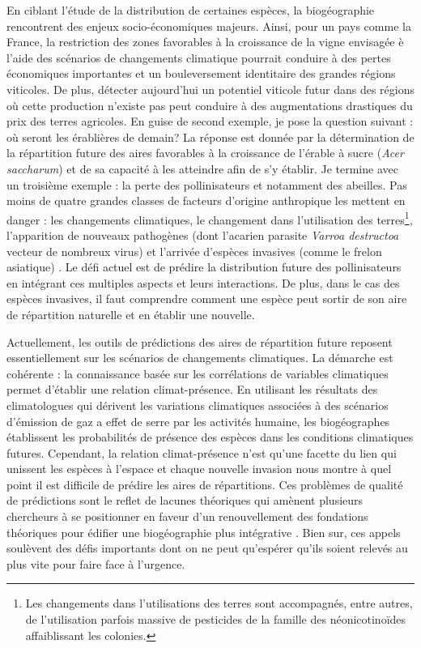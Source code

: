 En ciblant l'étude de la distribution de certaines espèces, la
biogéographie rencontrent des enjeux socio-économiques majeurs. Ainsi,
pour un pays comme la France, la restriction des zones favorables à la
croissance de la vigne envisagée è l'aide des scénarios de changements
climatique \citep{Hannah2013} pourrait conduire à des pertes économiques
importantes et un bouleversement identitaire des grandes régions
viticoles. De plus, détecter aujourd'hui un potentiel viticole futur
dans des régions où cette production n'existe pas peut conduire à des
augmentations drastiques du prix des terres agricoles. En guise de
second exemple, je pose la question suivant : où seront les érablières
de demain? La réponse est donnée par la détermination de la répartition
future des aires favorables à la croissance de l'érable à sucre
(\emph{Acer saccharum}) et de sa capacité à les atteindre afin de s'y
établir. Je termine avec un troisième exemple : la perte des
pollinisateurs et notamment des abeilles. Pas moins de quatre grandes
classes de facteurs d'origine anthropique les mettent en danger : les
changements climatiques, le changement dans l'utilisation des
terres\footnote{Les changements dans l'utilisations des terres sont
  accompagnés, entre autres, de l'utilisation parfois massive de
  pesticides de la famille des néonicotinoïdes affaiblissant les
  colonies.}, l'apparition de nouveaux pathogènes (dont l'acarien
parasite \emph{Varroa destructoa} vecteur de nombreux virus) et
l'arrivée d'espèces invasives (comme le frelon asiatique)
\citep{Vanbergen2013}. Le défi actuel est de prédire la distribution
future des pollinisateurs en intégrant ces multiples aspects et leurs
interactions. De plus, dans le cas des espèces invasives, il faut
comprendre comment une espèce peut sortir de son aire de répartition
naturelle et en établir une nouvelle.

Actuellement, les outils de prédictions des aires de répartition future
reposent essentiellement sur les scénarios de changements climatiques.
La démarche est cohérente : la connaissance basée sur les corrélations
de variables climatiques permet d'établir une relation climat-présence.
En utilisant les résultats des climatologues qui dérivent les variations
climatiques associées à des scénarios d'émission de gaz a effet de serre
par les activités humaine, les biogéographes établissent les
probabilités de présence des espèces dans les conditions climatiques
futures. Cependant, la relation climat-présence n'est qu'une facette du
lien qui unissent les espèces à l'espace et chaque nouvelle invasion
nous montre à quel point il est difficile de prédire les aires de
répartitions. Ces problèmes de qualité de prédictions sont le reflet de
lacunes théoriques qui amènent plusieurs chercheurs à se positionner en
faveur d'un renouvellement des fondations théoriques pour édifier une
biogéographie plus intégrative \citep[\citet{Beck2012},
\citet{Thuiller2013}]{Lomolino2000}. Bien sur, ces appels soulèvent des
défis importants dont on ne peut qu'espérer qu'ils soient relevés au
plus vite pour faire face à l'urgence.

